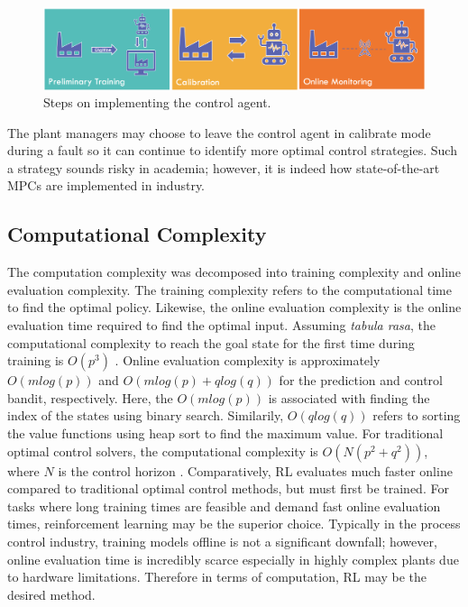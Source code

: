 \begin{figure}[h]
    \centering
    \includegraphics[width=12cm]{images/ftc/rl_implementation.png}
    \caption{Steps on implementing the control agent.}
    \label{fig:08RL_implementation}
\end{figure}

The plant managers may choose to leave the control agent in calibrate mode during a fault so it can continue to identify more optimal control strategies.  Such a strategy sounds risky in academia; however, it is indeed how state-of-the-art MPCs are implemented in industry.

\subsection{Computational Complexity}
The computation complexity was decomposed into training complexity and online evaluation complexity.  The training complexity refers to the computational time to find the optimal policy.  Likewise, the online evaluation complexity is the online evaluation time required to find the optimal input.  Assuming \textit{tabula rasa}, the computational complexity to reach the goal state for the first time during training is $O(p^3)$ \cite{complexity_rl_ref19}. Online evaluation complexity is approximately $O(mlog(p))$ and $O(mlog(p) + qlog(q))$ for the prediction and control bandit, respectively. Here, the $O(mlog(p))$ is associated with finding the index of the states using binary search.  Similarily, $O(qlog(q))$ refers to sorting the value functions using heap sort to find the maximum value. For traditional optimal control solvers, the computational complexity is $O(N(p^2 + q^2))$, where $N$ is the control horizon \cite{mpc_comp_time}. Comparatively, RL evaluates much faster online compared to traditional optimal control methods, but must first be trained. For tasks where long training times are feasible and demand fast online evaluation times, reinforcement learning may be the superior choice.  Typically in the process control industry, training models offline is not a significant downfall; however, online evaluation time is incredibly scarce especially in highly complex plants due to hardware limitations.  Therefore in terms of computation, RL may be the desired method.

